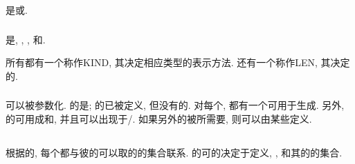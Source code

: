 \Type{}是\Intrinsic{}\Type{}或\DerivedType{}.

\subsubsection{\Intrinsic{}\Type{}}

\Intrinsic{}\Type{}是\IntegerType{}, \RealType{}, \ComplexType{}, \CharacterType{}和\LogicalType{}.

所有\Intrinsic{}\Type{}都有一个\Kind{}\TypeParameter{}称作KIND, 其决定相应类型的表示方法. \CharacterType{}还有一个\Length{}\TypeParameter{}称作LEN, 其决定\CharacterString{}的\Length{}.

\subsubsection{\DerivedType{}}

\DerivedType{}可以被参数化. \DerivedType{}的\Scalar{}\Object{}是\Structure{}; \Structure{}的\Assignment{}已被\Intrinsically{}定义, 但没有\Structure{}的\Intrinsic{}\Operation{}. 对每个\DerivedType{}, 都有一个\StructureConstructor{}可用于生成\Value{}. 另外, \DerivedType{}的\Object{}可用成\Procedure{}\Argument{}和\Function{}\Result{}, 并且可以出现于\Input{}/\Output{}\List{}. 如果另外的\Operation{}被\DerivedType{}所需要, 则可以由某些\Procedure{}定义.

\subsection{\Datum{}\Value{}}

根据\TypeParameter{}的\Value{}, 每个\Intrinsic{}\Type{}都与彼\Type{}的\Datum{}可以取的\Value{}的集合联系. \DerivedType{}的\Object{}可\Assume{}的\Value{}决定于\Type{}定义, \TypeParameter{}\Value{}, 和其\Component{}的\Value{}的集合.
